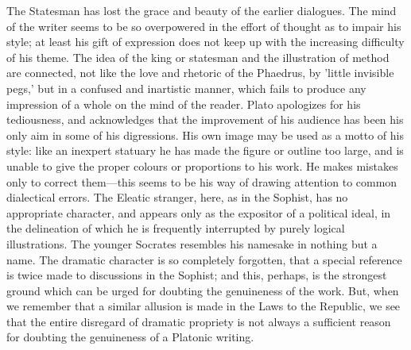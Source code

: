 \documentclass[11pt,letter]{article}
\begin{document}
\par  The Statesman has lost the grace and beauty of the earlier dialogues. The mind of the writer seems to be so overpowered in the effort of thought as to impair his style; at least his gift of expression does not keep up with the increasing difficulty of his theme. The idea of the king or statesman and the illustration of method are connected, not like the love and rhetoric of the Phaedrus, by 'little invisible pegs,' but in a confused and inartistic manner, which fails to produce any impression of a whole on the mind of the reader. Plato apologizes for his tediousness, and acknowledges that the improvement of his audience has been his only aim in some of his digressions. His own image may be used as a motto of his style: like an inexpert statuary he has made the figure or outline too large, and is unable to give the proper colours or proportions to his work. He makes mistakes only to correct them—this seems to be his way of drawing attention to common dialectical errors. The Eleatic stranger, here, as in the Sophist, has no appropriate character, and appears only as the expositor of a political ideal, in the delineation of which he is frequently interrupted by purely logical illustrations. The younger Socrates resembles his namesake in nothing but a name. The dramatic character is so completely forgotten, that a special reference is twice made to discussions in the Sophist; and this, perhaps, is the strongest ground which can be urged for doubting the genuineness of the work. But, when we remember that a similar allusion is made in the Laws to the Republic, we see that the entire disregard of dramatic propriety is not always a sufficient reason for doubting the genuineness of a Platonic writing.
\end{document}
